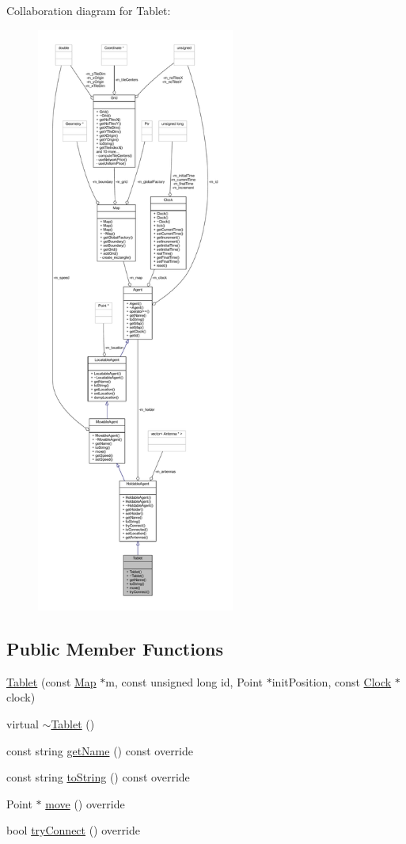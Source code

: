 Collaboration diagram for Tablet\+:\nopagebreak
\begin{figure}[H]
\begin{center}
\leavevmode
\includegraphics[height=550pt]{class_tablet__coll__graph}
\end{center}
\end{figure}
\subsection*{Public Member Functions}
\begin{DoxyCompactItemize}
\item 
\hyperlink{class_tablet_af457c0988b7a768659a284e16be58dc6}{Tablet} (const \hyperlink{class_map}{Map} $\ast$m, const unsigned long id, Point $\ast$init\+Position, const \hyperlink{class_clock}{Clock} $\ast$clock)
\item 
virtual \hyperlink{class_tablet_ac18d46eafd643e66dde81a3fefadab89}{$\sim$\+Tablet} ()
\item 
const string \hyperlink{class_tablet_adc7196aaee1e9714236b7cd8825d5826}{get\+Name} () const override
\item 
const string \hyperlink{class_tablet_a3fae01e7d526699476221c6a686a4fba}{to\+String} () const override
\item 
Point $\ast$ \hyperlink{class_tablet_ab1b8c7591be0c6ea118c8ab1c17839bb}{move} () override
\item 
bool \hyperlink{class_tablet_a2328422e1706dfeb2b51a6960e6879f0}{try\+Connect} () override
\end{DoxyCompactItemize}
